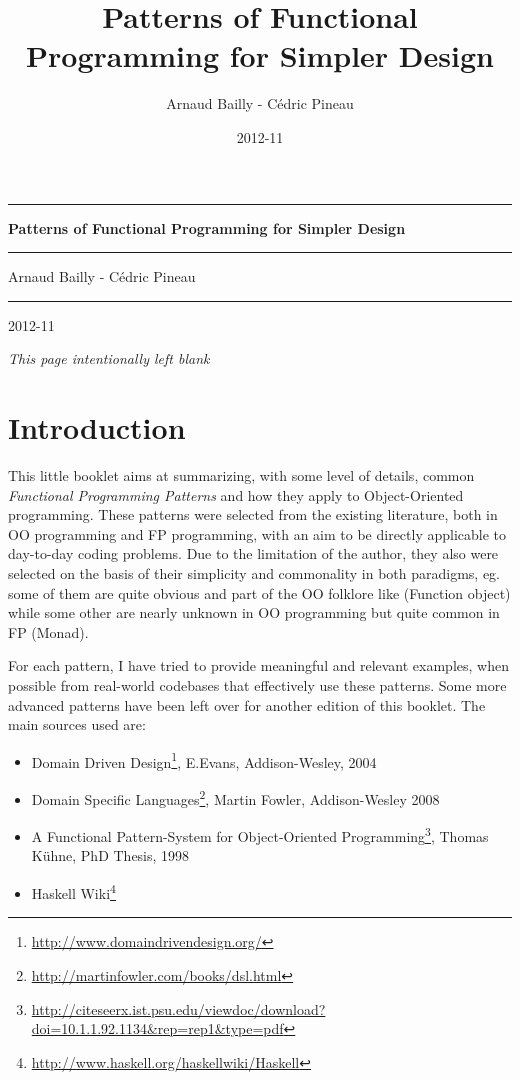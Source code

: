 \documentclass[11pt,]{article}
\title{Patterns of Functional Programming for Simpler Design}
\author{Arnaud Bailly - Cédric Pineau}
\date{2012-11}
\renewcommand{\href}[2]{#2\footnote{\url{#1}}}
\begin{document}
\thispagestyle{empty}
{\centering
\vspace{3cm}
\hrule
\vspace{1cm}
\Huge{\textbf{Patterns of Functional Programming for Simpler Design}}
\vspace{1cm}
\hrule
\vspace{3cm}
\Large{Arnaud Bailly - Cédric Pineau}
\vfill
\hrule
\large{2012-11}}
\newpage
\thispagestyle{empty}
{\centering \textit{This page intentionally left blank}}
\newpage


{
\hypersetup{linkcolor=black}
\tableofcontents
}
\section{Introduction}

This little booklet aims at summarizing, with some level of details,
common \emph{Functional Programming Patterns} and how they apply to
Object-Oriented programming. These patterns were selected from the
existing literature, both in OO programming and FP programming, with an
aim to be directly applicable to day-to-day coding problems. Due to the
limitation of the author, they also were selected on the basis of their
simplicity and commonality in both paradigms, eg. some of them are quite
obvious and part of the OO folklore like (Function object) while some
other are nearly unknown in OO programming but quite common in FP
(Monad).

For each pattern, I have tried to provide meaningful and relevant
examples, when possible from real-world codebases that effectively use
these patterns. Some more advanced patterns have been left over for
another edition of this booklet. The main sources used are:

\begin{itemize}
\item
  \href{http://www.domaindrivendesign.org/}{Domain Driven Design},
  E.Evans, Addison-Wesley, 2004
\item
  \href{http://martinfowler.com/books/dsl.html}{Domain Specific
  Languages}, Martin Fowler, Addison-Wesley 2008
\item
  \href{http://citeseerx.ist.psu.edu/viewdoc/download?doi=10.1.1.92.1134\&rep=rep1\&type=pdf}{A
  Functional Pattern-System for Object-Oriented Programming}, Thomas
  Kühne, PhD Thesis, 1998
\item
  \href{http://www.haskell.org/haskellwiki/Haskell}{Haskell Wiki}
\end{itemize}
\end{document}
